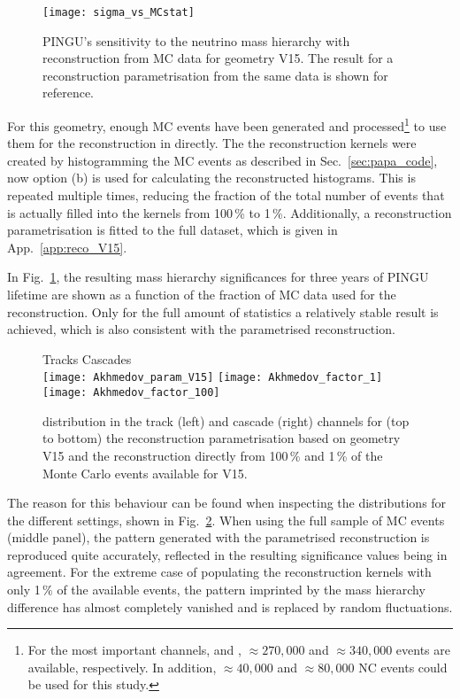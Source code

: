 \begin{figure}[thp]
 \centering
 \texttt{[image: sigma\_vs\_MCstat]}
 \caption{PINGU's sensitivity to the neutrino mass hierarchy with
  reconstruction from MC data for geometry V15. The result for a reconstruction
  parametrisation from the same data is shown for reference.}
 \label{fig:sigma_vs_MCstat}
\end{figure}

For this geometry, enough MC events have been generated and
processed\footnote{For the most important channels, \nue and \numu,
$\approx 270,000$ and $\approx 340,000$ events are available, respectively. In
addition, $\approx 40,000$ \nutau and $\approx 80,000$ \nux NC events could be
used for this study.} to use them for the reconstruction in \papa directly. The
the reconstruction kernels were created by histogramming the MC events
as described in Sec.~\ref{sec:papa_code}, \ie now option (b) is used for
calculating the reconstructed histograms. This is repeated multiple times, 
reducing the fraction of the total number of events that is actually filled into
the kernels from 100\,\% to 1\,\%. Additionally, a reconstruction
parametrisation is fitted to the full dataset, which is given in
App.~\ref{app:reco_V15}.

In Fig.~\ref{fig:sigma_vs_MCstat}, the resulting mass hierarchy significances
for three years of PINGU lifetime are shown as a function of the fraction of MC
data used for the reconstruction. Only for the full amount of statistics a
relatively stable result is achieved, which is also consistent with the
parametrised reconstruction.

\begin{figure}[p]
 \centering
   Tracks \hspace{5cm} Cascades\\
   \texttt{[image: Akhmedov\_param\_V15]}
   \texttt{[image: Akhmedov\_factor\_1]} 
   \texttt{[image: Akhmedov\_factor\_100]}
 \caption{\delchi distribution in the track (left) and cascade (right) channels
   for (top to bottom) the reconstruction parametrisation based on geometry V15
   and the reconstruction directly from 100\,\% and 1\,\% of the Monte Carlo
   events available for V15.}
 \label{fig:akhmedov_MCstats}
\end{figure}

The reason for this behaviour can be found when inspecting the \delchi
distributions for the different settings, shown in
Fig.~\ref{fig:akhmedov_MCstats}. When using the full sample of MC events
(middle panel), the pattern generated with the parametrised reconstruction is
reproduced quite accurately, reflected in the resulting significance values
being in agreement. For the extreme case of populating the reconstruction
kernels with only 1\,\% of the available events, the pattern imprinted by the
mass hierarchy difference has almost completely vanished and is replaced by
random fluctuations.

